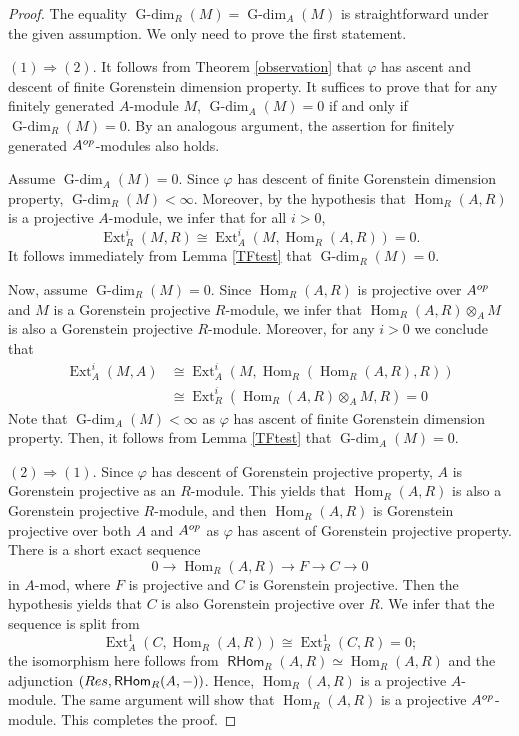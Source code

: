 \documentclass[10pt,a4paper]{amsart}
\DeclareMathOperator{\Ext}{Ext}
\DeclareMathOperator{\Gdim}{G-dim}
\DeclareMathOperator{\Hom}{Hom}
\DeclareMathOperator{\RHom}{\mathsf{RHom}}
\begin{document}
\begin{proof}
The equality $\Gdim_R(M)=\Gdim_A(M)$ is straightforward under the given assumption. We only need to prove the first statement.

$(1)\Rightarrow (2)$. It follows from Theorem \ref{observation} that $\varphi$ has ascent and descent of finite Gorenstein dimension property. It suffices to prove that for any finitely generated $A$-module $M$, $\Gdim_A(M)=0$ if and only if $\Gdim_R(M)=0$.
By an analogous argument, the assertion for finitely generated $A^{\rm op}$-modules also holds.

Assume $\Gdim_A(M)=0$. Since $\varphi$ has descent of finite Gorenstein dimension property, $\Gdim_R(M)<\infty$. Moreover, by the hypothesis that $\Hom_R(A,R)$ is a projective  $A$-module, we infer that for all $i>0$,
$$\Ext_R^i(M,R)\cong \Ext_A^i(M,\Hom_R(A,R)) = 0.$$
It follows immediately from Lemma \ref{TFtest} that $\Gdim_R(M)=0$. 


Now, assume $\Gdim_R(M)=0$. Since $\Hom_R(A,R)$ is projective over $A^{\rm op}$ and $M$ is a Gorenstein projective $R$-module, we infer that $\Hom_R(A,R)\otimes_A M$ is also a Gorenstein projective $R$-module. Moreover, for any $i>0$ we conclude that
\begin{align*}
  \Ext^i_A(M, A)&\cong \Ext^i_A(M,\Hom_R(\Hom_R(A,R),R))\\
    &\cong \Ext_R^i(\Hom_R(A,R)\otimes_A M, R) = 0
\end{align*}
Note that $\Gdim_A(M)<\infty$ as $\varphi$ has ascent of finite Gorenstein dimension property. Then, it follows from Lemma \ref{TFtest} that $\Gdim_A(M)=0$. 


$(2)\Rightarrow (1)$. Since $\varphi$ has descent of Gorenstein projective property, $A$ is Gorenstein projective as an $R$-module. This yields that $\Hom_R(A,R)$ is also a Gorenstein projective $R$-module, and then $\Hom_R(A,R)$ is Gorenstein projective over both $A$ and $A^{\rm op}$ as $\varphi$ has ascent of Gorenstein projective property. There is a short exact sequence
$$0\rightarrow \Hom_R(A,R)\rightarrow F\rightarrow C\rightarrow 0$$
in $A\mbox{-mod}$, where $F$ is projective and $C$ is Gorenstein projective. Then the hypothesis yields that $C$ is also Gorenstein projective over $R$. We infer that the sequence is split from
$$\Ext^1_A(C,\Hom_R(A,R)) \cong  \Ext^1_R(C,R) = 0;$$
the isomorphism here follows from $\RHom_R(A,R)\simeq \Hom_R(A,R)$ and the adjunction $({\rm Res}, \RHom_R(A,-))$.
Hence, $\Hom_R(A,R)$ is a projective  $A$-module. The same argument will show that $\Hom_R(A,R)$ is a projective $A^{\rm op}$-module.
This completes the proof.
\end{proof}
\end{document}
